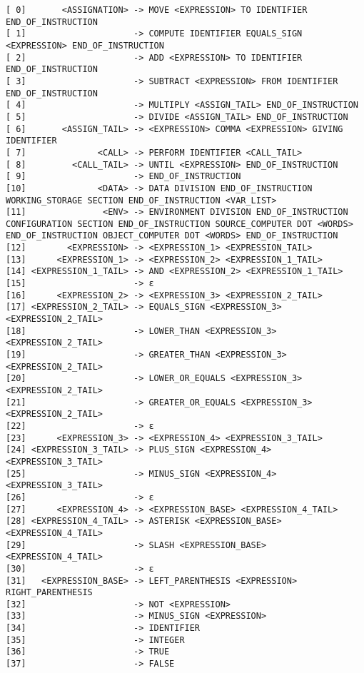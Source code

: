 \begin{lstlisting}[breaklines]
[ 0]       <ASSIGNATION> -> MOVE <EXPRESSION> TO IDENTIFIER END_OF_INSTRUCTION
[ 1]                     -> COMPUTE IDENTIFIER EQUALS_SIGN <EXPRESSION> END_OF_INSTRUCTION
[ 2]                     -> ADD <EXPRESSION> TO IDENTIFIER END_OF_INSTRUCTION
[ 3]                     -> SUBTRACT <EXPRESSION> FROM IDENTIFIER END_OF_INSTRUCTION
[ 4]                     -> MULTIPLY <ASSIGN_TAIL> END_OF_INSTRUCTION
[ 5]                     -> DIVIDE <ASSIGN_TAIL> END_OF_INSTRUCTION
[ 6]       <ASSIGN_TAIL> -> <EXPRESSION> COMMA <EXPRESSION> GIVING IDENTIFIER
[ 7]              <CALL> -> PERFORM IDENTIFIER <CALL_TAIL>
[ 8]         <CALL_TAIL> -> UNTIL <EXPRESSION> END_OF_INSTRUCTION
[ 9]                     -> END_OF_INSTRUCTION
[10]              <DATA> -> DATA DIVISION END_OF_INSTRUCTION WORKING_STORAGE SECTION END_OF_INSTRUCTION <VAR_LIST>
[11]               <ENV> -> ENVIRONMENT DIVISION END_OF_INSTRUCTION CONFIGURATION SECTION END_OF_INSTRUCTION SOURCE_COMPUTER DOT <WORDS> END_OF_INSTRUCTION OBJECT_COMPUTER DOT <WORDS> END_OF_INSTRUCTION
[12]        <EXPRESSION> -> <EXPRESSION_1> <EXPRESSION_TAIL> 
[13]      <EXPRESSION_1> -> <EXPRESSION_2> <EXPRESSION_1_TAIL>
[14] <EXPRESSION_1_TAIL> -> AND <EXPRESSION_2> <EXPRESSION_1_TAIL>
[15]                     -> ε
[16]      <EXPRESSION_2> -> <EXPRESSION_3> <EXPRESSION_2_TAIL>
[17] <EXPRESSION_2_TAIL> -> EQUALS_SIGN <EXPRESSION_3> <EXPRESSION_2_TAIL>
[18]                     -> LOWER_THAN <EXPRESSION_3> <EXPRESSION_2_TAIL>
[19]                     -> GREATER_THAN <EXPRESSION_3> <EXPRESSION_2_TAIL>
[20]                     -> LOWER_OR_EQUALS <EXPRESSION_3> <EXPRESSION_2_TAIL>
[21]                     -> GREATER_OR_EQUALS <EXPRESSION_3> <EXPRESSION_2_TAIL>
[22]                     -> ε
[23]      <EXPRESSION_3> -> <EXPRESSION_4> <EXPRESSION_3_TAIL>
[24] <EXPRESSION_3_TAIL> -> PLUS_SIGN <EXPRESSION_4> <EXPRESSION_3_TAIL>
[25]                     -> MINUS_SIGN <EXPRESSION_4> <EXPRESSION_3_TAIL>
[26]                     -> ε
[27]      <EXPRESSION_4> -> <EXPRESSION_BASE> <EXPRESSION_4_TAIL>
[28] <EXPRESSION_4_TAIL> -> ASTERISK <EXPRESSION_BASE> <EXPRESSION_4_TAIL>
[29]                     -> SLASH <EXPRESSION_BASE> <EXPRESSION_4_TAIL>
[30]                     -> ε
[31]   <EXPRESSION_BASE> -> LEFT_PARENTHESIS <EXPRESSION> RIGHT_PARENTHESIS
[32]                     -> NOT <EXPRESSION>
[33]                     -> MINUS_SIGN <EXPRESSION>
[34]                     -> IDENTIFIER
[35]                     -> INTEGER
[36]                     -> TRUE
[37]                     -> FALSE

\end{lstlisting}
